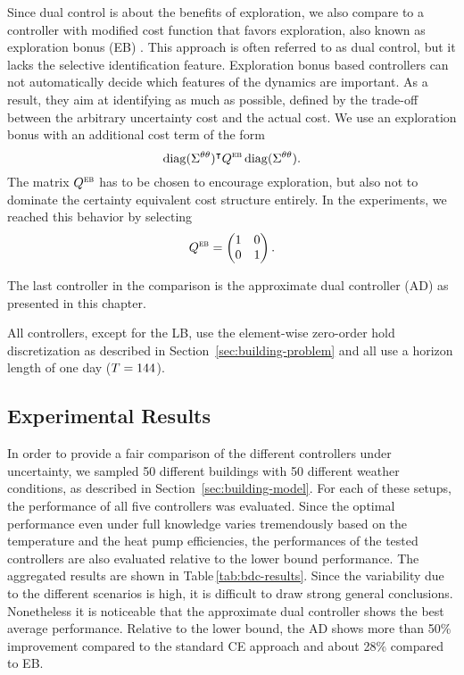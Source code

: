 Since dual control is about the benefits of exploration, we also compare to a
controller with modified cost function that favors exploration, also known as
exploration bonus (EB)
%
%
%
%
.
This approach is often referred to as dual control, but it lacks the selective
identification feature. Exploration bonus based controllers can not
automatically decide which features of the dynamics are important. As a result,
they aim at identifying as much as possible, defined by the trade-off between
the arbitrary uncertainty cost and the actual cost. We
use an exploration bonus with an additional cost term of the form
\begin{equation}
  \operatorname{diag}(\Sigma^{\theta\theta})^{\intercal} Q^{\normalfont\textsc{eb}} \operatorname{diag}(\Sigma^{\theta\theta}).
\end{equation}
The matrix $Q^{\normalfont\textsc{eb}}$ has to be chosen to encourage exploration, but also
not to dominate the certainty equivalent cost structure entirely. In the
experiments, we reached this behavior by selecting
\begin{equation}
 Q^{\normalfont\textsc{eb}}  = \begin{pmatrix} 1 & 0 \\ 0 & 1 \end{pmatrix}.
\end{equation}

The last controller in the comparison is the approximate dual controller (AD)
as presented in this chapter.

All controllers, except for the LB, use the element-wise zero-order hold
discretization as described in Section~\ref{sec:building-problem} and all use a
horizon length of one day ($T=144$).

\subsection{Experimental Results}

In order to provide a fair comparison of the different controllers under
uncertainty, we sampled 50 different buildings with 50 different weather
conditions, as described in Section~\ref{sec:building-model}. For each of these
setups, the performance of all five controllers was evaluated. Since the
optimal performance even under full knowledge varies tremendously based on the
temperature and the heat pump efficiencies, the performances of the tested
controllers are also evaluated relative to the lower bound performance. The
aggregated results are shown in Table\,\ref{tab:bdc-results}. Since the
variability due to the different scenarios is high, it is difficult to draw
strong general conclusions. Nonetheless it is noticeable that the approximate
dual controller shows the best average performance. Relative to the lower bound,
the AD shows more than 50\% improvement compared to the standard CE approach and
about 28\% compared to EB.

